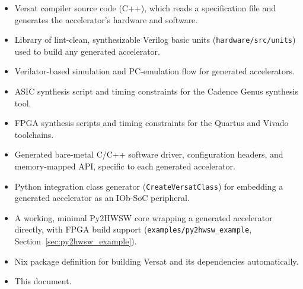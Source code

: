%

\begin{itemize}
  \itemsep-0.5em
  \item Versat compiler source code (C++), which reads a specification
    file and generates the accelerator's hardware and software.
  \item Library of lint-clean, synthesizable Verilog basic units
    (\texttt{hardware/src/units}) used to build any generated accelerator.
  \item Verilator-based simulation and PC-emulation flow for generated
    accelerators.
  \item ASIC synthesis script and timing constraints for the Cadence Genus
    synthesis tool.
  \item FPGA synthesis scripts and timing constraints for the Quartus and
    Vivado toolchains.
  \item Generated bare-metal C/C++ software driver, configuration headers,
    and memory-mapped API, specific to each generated accelerator.
  \item Python integration class generator (\texttt{CreateVersatClass}) for
    embedding a generated accelerator as an IOb-SoC peripheral.
  \item A working, minimal Py2HWSW core wrapping a generated accelerator
    directly, with FPGA build support (\texttt{examples/py2hwsw\_example},
    Section~\ref{sec:py2hwsw_example}).
  \item Nix package definition for building Versat and its dependencies
    automatically.
  \item This document.
\end{itemize}
